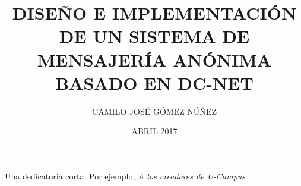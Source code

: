 \documentclass[upright, contnum]{umemoria}
\author{CAMILO JOSÉ GÓMEZ NÚÑEZ}
\title{DISEÑO E IMPLEMENTACIÓN DE UN SISTEMA DE MENSAJERÍA ANÓNIMA BASADO EN DC-NET}
\date{ABRIL 2017}
\begin{document}
\frontmatter
\maketitle

\begin{abstract}
{\lipsum[1-4]}
\end{abstract}

\begin{dedicatoria} %
Una dedicatoria corta. Por ejemplo, \emph{A los creadores de U-Campus}
\end{dedicatoria}

\begin{thanks} %
\lipsum[1-2]
\end{thanks}
\cleardoublepage

\tableofcontents

\mainmatter













\end{document}
